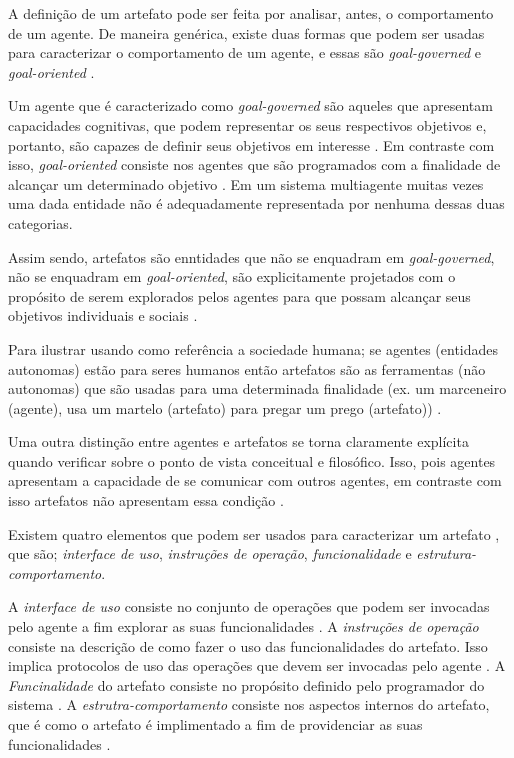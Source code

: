 A definição de um artefato pode ser feita por analisar, antes, o comportamento de um agente. De maneira genérica, existe duas formas que podem ser
usadas para caracterizar o comportamento de um agente, e essas são \textit{goal-governed} e \textit{goal-oriented} \cite{relationwithagentprogram} \cite{programingagentartefact}.

Um agente que é caracterizado como \textit{goal-governed} são aqueles que apresentam capacidades cognitivas, que podem representar os seus respectivos objetivos
e, portanto, são capazes de definir seus objetivos em interesse \cite{relationwithagentprogram} \cite{programingagentartefact}. Em contraste com isso, \textit{goal-oriented} consiste nos agentes que são programados
com a finalidade de alcançar um determinado objetivo \cite{relationwithagentprogram} \cite{programingagentartefact}. Em um sistema multiagente muitas vezes
uma dada entidade não é adequadamente representada por nenhuma dessas duas categorias. 

Assim sendo, artefatos são enntidades que não se enquadram em  \textit{goal-governed}, não se enquadram em \textit{goal-oriented}, são explicitamente projetados com o propósito de serem explorados pelos agentes para que
possam alcançar seus objetivos individuais e sociais \cite{programingagentartefact} \cite{cartago}. 

Para ilustrar usando como referência a sociedade humana; se agentes (entidades autonomas) estão para seres humanos então artefatos são as ferramentas (não autonomas)
que são usadas para uma determinada finalidade (ex. um marceneiro (agente), usa um martelo (artefato) para pregar um prego (artefato)) \cite{programingagentartefact}.

Uma outra distinção entre agentes e artefatos se torna claramente explícita quando verificar sobre o ponto de vista conceitual e filosófico. Isso, pois
agentes apresentam a capacidade de se comunicar com outros agentes, em contraste com isso artefatos não apresentam essa condição \cite{programingagentartefact}.

Existem quatro elementos que podem ser usados para caracterizar um artefato \cite{programingagentartefact}, que são; \textit{interface de uso}, \textit{instruções de operação},
\textit{funcionalidade} e \textit{estrutura-comportamento}.

A \textit{interface de uso} consiste no conjunto de operações que podem ser invocadas pelo agente a fim explorar as suas funcionalidades \cite{programingagentartefact}. 
A \textit{instruções de operação} consiste na descrição de como fazer o uso das funcionalidades do artefato. Isso implica protocolos de uso das operações 
que devem ser invocadas pelo agente \cite{programingagentartefact}. A \textit{Funcinalidade} do artefato consiste no propósito definido pelo programador 
do sistema \cite{programingagentartefact}. A \textit{estrutra-comportamento} consiste nos aspectos internos do artefato, que é como o artefato é implimentado
a fim de providenciar as suas funcionalidades \cite{programingagentartefact}.    

